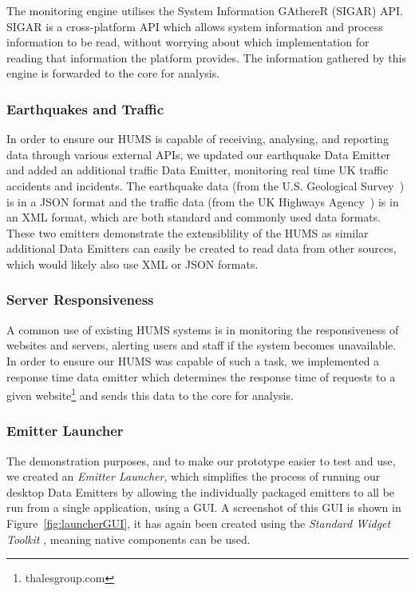 \documentclass[10pt,a4paper]{article}
\begin{document}
The monitoring engine utilises the System Information GAthereR (SIGAR) API. SIGAR is a cross-platform API which allows system information and process information to be read, without worrying about which implementation for reading that information the platform provides. The information gathered by this engine is forwarded to the core for analysis.

\subsubsection{Earthquakes and Traffic}
In order to ensure our HUMS is capable of receiving, analysing, and reporting data through various external APIs, we updated our earthquake Data Emitter and added an additional traffic Data Emitter, monitoring real time UK traffic accidents and incidents. The earthquake data (from the U.S. Geological Survey~\cite{us_geo}) is in a JSON format and the traffic data (from the UK Highways Agency~\cite{ha_traffic}) is in an XML format, which are both standard and commonly used data formats. These two emitters demonstrate the extensiblility of the HUMS as similar additional Data Emitters can easily be created to read data from other sources, which would likely also use XML or JSON formats.

\subsubsection{Server Responsiveness}
A common use of existing HUMS systems is in monitoring the responsiveness of websites and servers, alerting users and staff if the system becomes unavailable. In order to ensure our HUMS was capable of such a task, we implemented a response time data emitter which determines the response time of requests to a given website\footnote{thalesgroup.com} and sends this data to the core for analysis.

\subsubsection{Emitter Launcher}
The demonstration purposes, and to make our prototype easier to test and use, we created an \emph{Emitter Launcher}, which simplifies the process of running our desktop Data Emitters by allowing the individually packaged emitters to all be run from a single application, using a GUI. A screenshot of this GUI is shown in Figure~\ref{fig:launcherGUI}, it has again been created using the \emph{Standard Widget Toolkit} \cite{swt}, meaning native components can be used.
 
\end{document}
